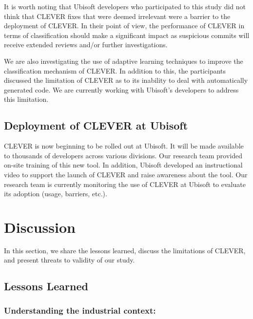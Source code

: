 \documentclass[sigconf]{acmart}
\begin{document}
It is worth noting that Ubisoft developers who participated to this
study did not think that CLEVER fixes that were deemed irrelevant were a
barrier to the deployment of CLEVER. In their point of view, the
performance of CLEVER in terms of classification should make a
significant impact as suspicious commits will receive extended reviews
and/or further investigations.

We are also investigating the use of adaptive learning techniques to
improve the classification mechanism of CLEVER. In addition to this, the
participants discussed the limitation of CLEVER as to its inability to
deal with automatically generated code. We are currently working with
Ubisoft's developers to address this limitation.

\subsection{Deployment of CLEVER at
Ubisoft}\label{deployment-of-clever-at-ubisoft}

CLEVER is now beginning to be rolled out at Ubisoft. It will be made
available to thousands of developers across various divisions. Our
research team provided on-site training of this new tool. In addition,
Ubisoft developed an instructional video to support the launch of CLEVER
and raise awareness about the tool. Our research team is currently
monitoring the use of CLEVER at Ubisoft to evaluate its adoption (usage,
barriers, etc.).

\section{Discussion}\label{sec:threats}

In this section, we share the lessons learned, discuss the limitations
of CLEVER, and present threats to validity of our study.

\subsection{Lessons Learned}\label{lessons-learned}

\subsubsection{Understanding the industrial
context:}\label{understanding-the-industrial-context}
\end{document}
